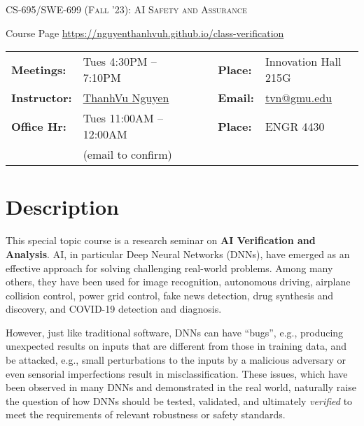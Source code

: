 \documentclass[11pt]{article}
\begin{document}
\begin{center}
{\Large \textsc{CS-695/SWE-699 (Fall '23): AI Safety and Assurance}}
\end{center}
\begin{center}
Course Page \url{https://nguyenthanhvuh.github.io/class-verification}
\end{center}

\begin{center}
\begin{minipage}[t]{.75\textwidth}
\begin{tabular}{llcccll}
  \toprule
  \textbf{Meetings:} & Tues 4:30PM -- 7:10PM  & & & & \textbf{Place:} & Innovation Hall 215G\\
\textbf{Instructor:} & \href{https://go.gmu.edu/tvn}{ThanhVu Nguyen} & & &  & \textbf{Email:} &  \href{mailto:tvn@gmu.edu}{tvn@gmu.edu}\\
\textbf{Office Hr:} & Tues 11:00AM -- 12:00AM & & & & \textbf{Place:} & ENGR 4430\\
&(email to confirm)&&&&&\\
\bottomrule
\end{tabular}
\end{minipage}
\end{center}


\section{Description}
This special topic course is a research seminar on \textbf{\textbf{AI Verification and Analysis}}.  AI, in particular Deep Neural Networks (DNNs), have emerged as an effective approach for solving challenging real-world problems. Among many others, they have been used for image recognition, autonomous driving, airplane collision control,
power grid control, fake news detection, drug synthesis and discovery, 
and COVID-19 detection and diagnosis.

However, just like traditional software, DNNs can have ``bugs'', e.g., producing unexpected results on inputs that are different from those in training data, and be attacked, e.g., small perturbations to the inputs by a malicious adversary or even sensorial imperfections result in misclassification.
These issues, which have been observed in many DNNs and demonstrated in the real world,  naturally raise the question of how DNNs should be tested, validated, and ultimately \emph{verified} to meet the requirements of relevant robustness or safety standards.
\end{document}

